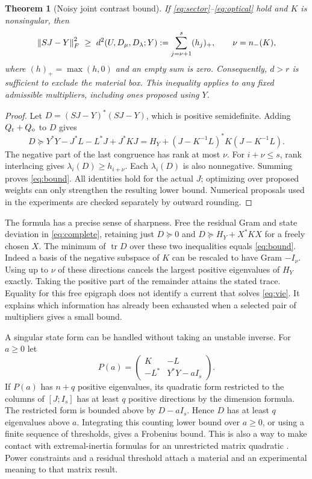 \documentclass[anonymous,12pt]{iopjournal}
\newtheorem{theorem}{Theorem}[section]
\theoremstyle{remark}\newtheorem{remark}[theorem]{Remark}
\newcommand{\tr}{\operatorname{tr}}\newcommand{\diag}{\operatorname{diag}}
\newcommand{\Dpos}{D_{\mu}}\newcommand{\Dopt}{D_{\lambda}}
\numberwithin{equation}{section}
\begin{document}
\begin{theorem}[Noisy joint contrast bound]\label{th:bound}
If \eqref{eq:sector}--\eqref{eq:optical} hold and $K$ is nonsingular, then
\begin{equation}
 \norm{SJ-Y}_F^2\ \ge\ d^2(U,\Dpos,\Dopt;Y)
   :=\sum_{j=\nu+1}^{s}(h_j)_+,\qquad \nu=n_-(K), \label{eq:bound}
\end{equation}
where $(h)_+=\max(h,0)$ and an empty sum is zero. Consequently, $d>r$ is sufficient to exclude the material box. This inequality applies to any fixed admissible multipliers, including ones proposed using $Y$.
\end{theorem}
\begin{proof}
Let $D=(SJ-Y)^*(SJ-Y)$, which is positive semidefinite. Adding $Q_{\rm r}+Q_{\rm o}$ to $D$ gives
\begin{equation}
 D\succeq Y^*Y-J^*L-L^*J+J^*KJ
 =H_Y+(J-K^{-1}L)^*K(J-K^{-1}L).\label{eq:complete}
\end{equation}
The negative part of the last congruence has rank at most $\nu$. For $i+\nu\le s$, rank interlacing gives $\lambda_i(D)\ge h_{i+\nu}$. Each $\lambda_i(D)$ is also nonnegative. Summing proves \eqref{eq:bound}. All identities hold for the actual $J$; optimizing over proposed weights can only strengthen the resulting lower bound. Numerical proposals used in the experiments are checked separately by outward rounding.
\end{proof}

The formula has a precise sense of sharpness. Free the residual Gram and state deviation in \eqref{eq:complete}, retaining just $D\succeq0$ and $D\succeq H_Y+X^*KX$ for a freely chosen $X$. The minimum of $\tr D$ over these two inequalities equals \eqref{eq:bound}. Indeed a basis of the negative subspace of $K$ can be rescaled to have Gram $-I_\nu$. Using up to $\nu$ of these directions cancels the largest positive eigenvalues of $H_Y$ exactly. Taking the positive part of the remainder attains the stated trace. Equality for this free epigraph does not identify a current that solves \eqref{eq:vie}. It explains which information has already been exhausted when a selected pair of multipliers gives a small bound.

A singular state form can be handled without taking an unstable inverse. For $a\ge0$ let
\begin{equation}
 P(a)=\begin{pmatrix}K&-L\\-L^*&Y^*Y-aI_s\end{pmatrix}.
\end{equation}
If $P(a)$ has $n+q$ positive eigenvalues, its quadratic form restricted to the columns of $[J;I_s]$ has at least $q$ positive directions by the dimension formula. The restricted form is bounded above by $D-aI_s$. Hence $D$ has at least $q$ eigenvalues above $a$. Integrating this counting lower bound over $a\ge0$, or using a finite sequence of thresholds, gives a Frobenius bound. This is also a way to make contact with extremal-inertia formulas for an unrestricted matrix quadratic \cite{tian}. Power constraints and a residual threshold attach a material and an experimental meaning to that matrix result.
\end{document}
